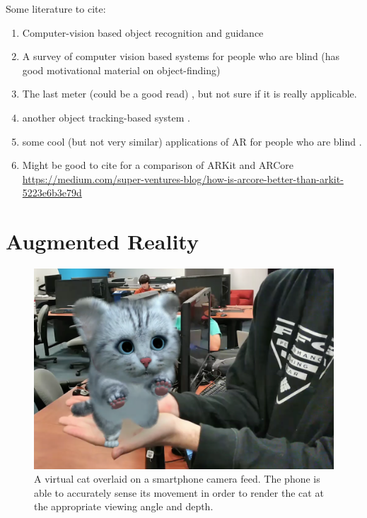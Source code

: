 \documentclass[chi_draft]{sigchi}
\begin{document}
Some literature to cite:
\begin{enumerate}
\item Computer-vision based object recognition and guidance \cite{schauerte2012assistive}
\item A survey of computer vision based systems for people who are blind \cite{jafri2014computer} (has good motivational material on object-finding)
\item The last meter (could be a good read) \cite{manduchi2014last}, but not sure if it is really applicable.
\item another object tracking-based system \cite{thakoor2014system}.
\item some cool (but not very similar) applications of AR for people who are blind \cite{coughlan2017ar4vi}.
\item Might be good to cite for a comparison of ARKit and ARCore \url{https://medium.com/super-ventures-blog/how-is-arcore-better-than-arkit-5223e6b3e79d}
\end{enumerate}

\section{Augmented Reality}

\begin{figure}
\begin{center}
\includegraphics[width=.9\linewidth]{Figures/arexample.png}
\end{center}
\caption{A virtual cat overlaid on a smartphone camera feed.  The phone is able to accurately sense its movement in order to render the cat at the appropriate viewing angle and depth.\label{fig:arexample}}
\end{figure}
\end{document}

